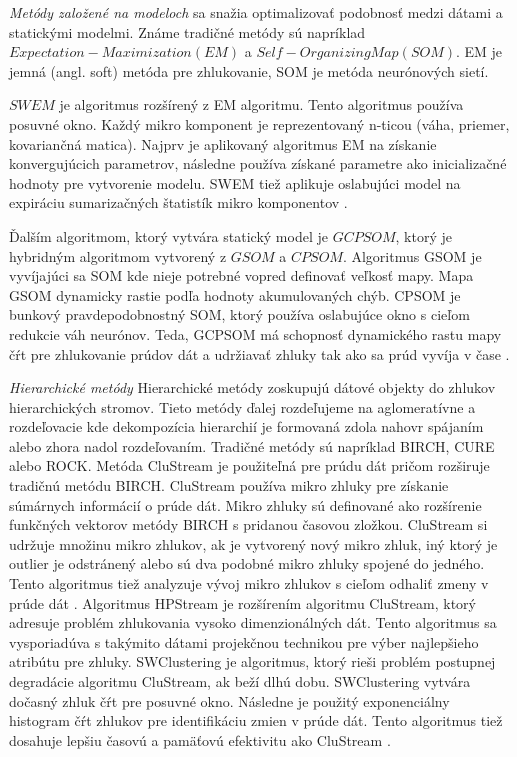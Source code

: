 \textit{Metódy založené na modeloch} sa snažia optimalizovať podobnosť medzi dátami a statickými modelmi. Známe tradičné metódy sú napríklad $Expectation-Maximization (EM)$ a $Self-Organizing Map (SOM)$. EM je jemná (angl. soft) metóda pre zhlukovanie, SOM je metóda neurónových sietí.
\par
$SWEM$ je algoritmus rozšírený z EM algoritmu. Tento algoritmus používa posuvné okno. Každý mikro komponent je reprezentovaný n-ticou (váha, priemer, kovariančná matica). Najprv je aplikovaný algoritmus EM na získanie konvergujúcich parametrov, následne používa získané parametre ako inicializačné hodnoty pre vytvorenie modelu. SWEM tiež aplikuje oslabujúci model na expiráciu sumarizačných štatistík mikro komponentov \citep{nguyen2015survey}.
\par
Ďalším algoritmom, ktorý vytvára statický model je $GCPSOM$, ktorý je hybridným algoritmom vytvorený z $GSOM$ a $CPSOM$. Algoritmus GSOM je vyvíjajúci sa SOM kde nieje potrebné vopred definovať veľkosť mapy. Mapa GSOM dynamicky rastie podľa hodnoty akumulovaných chýb. CPSOM je bunkový pravdepodobnostný SOM, ktorý používa oslabujúce okno s cieľom redukcie váh neurónov. Teda, GCPSOM má schopnosť dynamického rastu mapy čŕt pre zhlukovanie prúdov dát a udržiavať zhluky tak ako sa prúd vyvíja v čase \citep{nguyen2015survey}.

\textit{Hierarchické metódy}
Hierarchické metódy zoskupujú dátové objekty do zhlukov hierarchických stromov. Tieto metódy ďalej rozdeľujeme na aglomeratívne a rozdeľovacie kde dekompozícia hierarchií je formovaná zdola nahovr spájaním alebo zhora nadol rozdeľovaním. Tradičné metódy sú napríklad BIRCH, CURE alebo  ROCK. Metóda CluStream je použiteľná pre prúdu dát pričom rozširuje tradičnú metódu BIRCH. CluStream používa mikro zhluky pre získanie súmárnych informácií o prúde dát. Mikro zhluky sú definované ako rozšírenie funkčných vektorov metódy BIRCH s pridanou časovou zložkou. CluStream si udržuje množinu mikro zhlukov, ak je vytvorený nový mikro zhluk, iný ktorý je outlier je odstránený alebo sú dva podobné mikro zhluky spojené do jedného. Tento algoritmus tiež analyzuje vývoj mikro zhlukov s cieľom odhaliť zmeny v prúde dát \citep{nguyen2015survey}. Algoritmus HPStream je rozšírením algoritmu CluStream, ktorý adresuje problém zhlukovania vysoko dimenzionálných dát. Tento algoritmus sa vysporiadúva s takýmito dátami projekčnou technikou pre výber najlepšieho atribútu pre zhluky. SWClustering je algoritmus, ktorý rieši problém postupnej degradácie algoritmu CluStream, ak beží dlhú dobu. SWClustering vytvára dočasný zhluk čŕt pre posuvné okno. Následne je použitý exponenciálny histogram čŕt zhlukov pre identifikáciu zmien v prúde dát. Tento algoritmus tiež dosahuje lepšiu časovú a pamäťovú efektivitu ako CluStream \citep{han2011data}.

